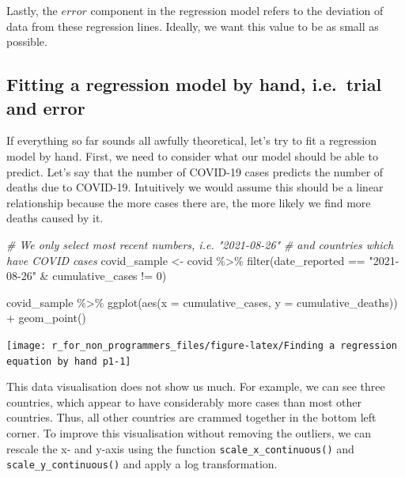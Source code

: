 \documentclass[
]{book}
\newenvironment{Shaded}{\begin{snugshade}}{\end{snugshade}}
\newcommand{\AttributeTok}[1]{\textcolor[rgb]{0.77,0.63,0.00}{#1}}
\newcommand{\CommentTok}[1]{\textcolor[rgb]{0.56,0.35,0.01}{\textit{#1}}}
\newcommand{\DecValTok}[1]{\textcolor[rgb]{0.00,0.00,0.81}{#1}}
\newcommand{\FunctionTok}[1]{\textcolor[rgb]{0.00,0.00,0.00}{#1}}
\newcommand{\NormalTok}[1]{#1}
\newcommand{\OtherTok}[1]{\textcolor[rgb]{0.56,0.35,0.01}{#1}}
\newcommand{\SpecialCharTok}[1]{\textcolor[rgb]{0.00,0.00,0.00}{#1}}
\newcommand{\StringTok}[1]{\textcolor[rgb]{0.31,0.60,0.02}{#1}}
\begin{document}
Lastly, the \(error\) component in the regression model refers to the deviation of data from these regression lines. Ideally, we want this value to be as small as possible.

\hypertarget{fitting-a-regression-model-by-hand}{%
\subsection{Fitting a regression model by hand, i.e.~trial and error}\label{fitting-a-regression-model-by-hand}}

If everything so far sounds all awfully theoretical, let's try to fit a regression model by hand. First, we need to consider what our model should be able to predict. Let's say that the number of COVID-19 cases predicts the number of deaths due to COVID-19. Intuitively we would assume this should be a linear relationship because the more cases there are, the more likely we find more deaths caused by it.

\begin{Shaded}
\begin{Highlighting}[]
\CommentTok{\# We only select most recent numbers, i.e. "2021{-}08{-}26"}
\CommentTok{\# and countries which have COVID cases}
\NormalTok{covid\_sample }\OtherTok{\textless{}{-}}\NormalTok{ covid }\SpecialCharTok{\%\textgreater{}\%}
  \FunctionTok{filter}\NormalTok{(date\_reported }\SpecialCharTok{==} \StringTok{"2021{-}08{-}26"} \SpecialCharTok{\&}
\NormalTok{           cumulative\_cases }\SpecialCharTok{!=} \DecValTok{0}\NormalTok{)}

\NormalTok{covid\_sample }\SpecialCharTok{\%\textgreater{}\%}
  \FunctionTok{ggplot}\NormalTok{(}\FunctionTok{aes}\NormalTok{(}\AttributeTok{x =}\NormalTok{ cumulative\_cases,}
             \AttributeTok{y =}\NormalTok{ cumulative\_deaths)) }\SpecialCharTok{+}
  \FunctionTok{geom\_point}\NormalTok{()}
\end{Highlighting}
\end{Shaded}

\begin{center}\texttt{[image: r\_for\_non\_programmers\_files/figure-latex/Finding a regression equation by hand p1-1]} \end{center}

This data visualisation does not show us much. For example, we can see three countries, which appear to have considerably more cases than most other countries. Thus, all other countries are crammed together in the bottom left corner. To improve this visualisation without removing the outliers, we can rescale the x- and y-axis using the function \texttt{scale\_x\_continuous()} and \texttt{scale\_y\_continuous()} and apply a log transformation.
\end{document}
